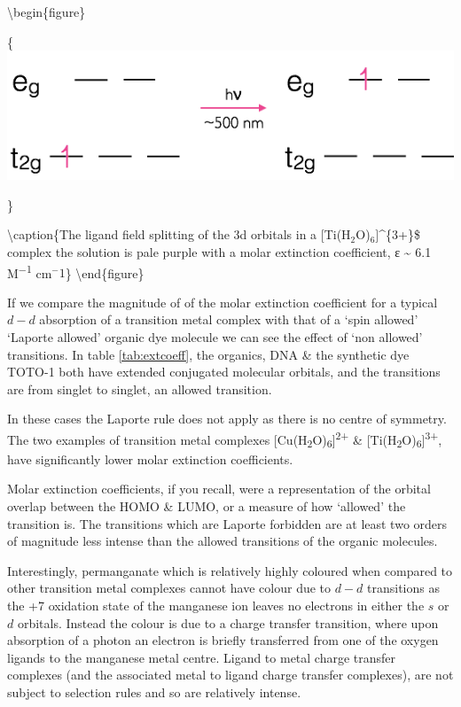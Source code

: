 \documentclass[
]{book}
\begin{document}
\textbackslash begin\{figure\}

\{\centering \includegraphics[width=0.6\linewidth]{images/Ti3splitting}

\}

\textbackslash caption\{The ligand field splitting of the 3d orbitals in a {[}Ti(H\(_2\)O)\(_6]\)\^{}\{3+\}\$ complex the solution is pale purple with a molar extinction coefficient, ε \textasciitilde{} 6.1 M\textsuperscript{−1} cm\(^{−}1\)\}\label{fig:Tisplitting}
\textbackslash end\{figure\}

If we compare the magnitude of of the molar extinction coefficient for a typical \(d-d\) absorption of a transition metal complex with that of a `spin allowed' `Laporte allowed' organic dye molecule we can see the effect of `non allowed' transitions. In table \ref{tab:extcoeff}, the organics, DNA \& the synthetic dye TOTO-1 both have extended conjugated molecular orbitals, and the transitions are from singlet to singlet, an allowed transition.

In these cases the Laporte rule does not apply as there is no centre of symmetry. The two examples of transition metal complexes {[}Cu(H\textsubscript{2}O)\textsubscript{6}{]}\textsuperscript{2+} \& {[}Ti(H\textsubscript{2}O)\textsubscript{6}{]}\textsuperscript{3+}, have significantly lower molar extinction coefficients.

Molar extinction coefficients, if you recall, were a representation of the orbital overlap between the HOMO \& LUMO, or a measure of how `allowed' the transition is. The transitions which are Laporte forbidden are at least two orders of magnitude less intense than the allowed transitions of the organic molecules.

Interestingly, permanganate which is relatively highly coloured when compared to other transition metal complexes cannot have colour due to \(d-d\) transitions as the +7 oxidation state of the manganese ion leaves no electrons in either the \(s\) or \(d\) orbitals. Instead the colour is due to a charge transfer transition, where upon absorption of a photon an electron is briefly transferred from one of the oxygen ligands to the manganese metal centre. Ligand to metal charge transfer complexes (and the associated metal to ligand charge transfer complexes), are not subject to selection rules and so are relatively intense.
\end{document}
